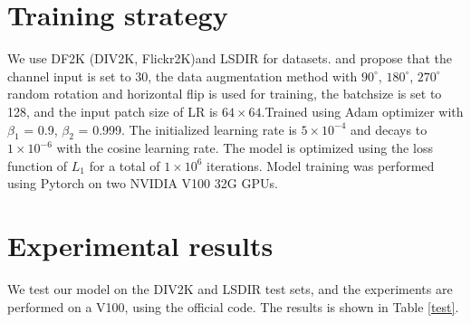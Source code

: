 \documentclass[10pt,twocolumn,letterpaper]{article}
\begin{document}
\section{Training strategy}
We use DF2K (DIV2K\cite{DIV2K}, Flickr2K\cite{EDSR})and LSDIR for datasets. and propose that the channel input is set to 30, the data augmentation method with $90^\circ$, $180^\circ$, $270^\circ$ random rotation and horizontal flip is used for training, the batchsize is set to 128, and the input patch size of LR is $64\times64$.Trained using Adam optimizer\cite{Adam} with $\beta_1$ = 0.9, $\beta_2$ = 0.999. The initialized learning rate is $5\times10^{-4}$ and decays to $1\times10^{-6}$ with the cosine learning rate. The model is optimized using the loss function of $L_1$ for a total of $1\times10^6$ iterations. Model training was performed using Pytorch\cite{pytorch} on two NVIDIA V100 32G GPUs.

\section{Experimental results}
We test our model on the DIV2K and LSDIR test sets, and the experiments are performed on a V100, using the official code. The results is shown in Table \ref{test}.
\begin{table}[h]
	\centering
	\caption{ Result of DIV2K and LSDIR test sets}
	\label{test}
	
\end{table}


{\small


}
\end{document}
